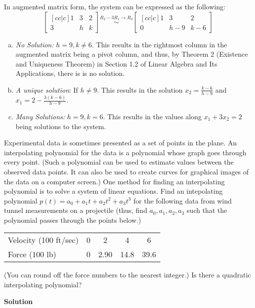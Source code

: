 \documentclass[11pt]{scrartcl}
\theoremstyle{dotlessP}
\theoremstyle{dotlessN}
\begin{document}
In augmented matrix form, the system can be expressed as the following:
\[
	\begin{bmatrix}[cc|c]
	1 & 3 & 2 \\
	3 & h & k
\end{bmatrix} \stackrel{R_2 - 3R_1 \to R_2}{\sim} 
\begin{bmatrix}[cc|c]
	1 & 3 & 2 \\
	0 & h-9 & k-6
\end{bmatrix}
\] 
\begin{enumerate}[a)]
	\item \textit{No Solution:} $h = 9, k \neq 6$. This results in the rightmost column in the augmented matrix being a pivot column, and thus, by Theorem 2 (Existence and Uniqueness Theorem) in Section 1.2 of Linear Algebra and Its Applications, there is is no solution.
	\item \textit{A unique solution}: If $h \neq 9$. This results in the solution $x_2 = \frac{k-6}{h-9}$ and $x_1 = 2 - \frac{3(k-6)}{h-9}$.
	\item \textit{Many Solutions:} $h = 9, k=6$. This results in the values along $x_1 + 3x_2 = 2$ being solutions to the system.
\end{enumerate}
\begin{ques}
	Experimental data is sometimes presented as a set of points in the plane. An interpolating polynomial for the data is a polynomial whose graph goes through every point. (Such a polynomial can be used to estimate values between the observed data points. It can also be used to create curves for graphical images of the data on a computer screen.) One method for finding an interpolating polynomial is to solve a system of linear equations. Find an intepolating polynomial $p(t) = a_0 + a_1t + a_2t^2 + a_3t^3$ for the following data from wind tunnel measurements on a projectile (thus, find $a_0,a_1,a_2,a_3$ such that the polynomial passes through the points below.)
	\begin{center}
		\begin{tabular}{l|cccc}
			\hline
			Velocity (100 ft/sec) & 0 & 2 & 4 & 6 \\
			Force (100 lb) & 0 & 2.90 & 14.8 & 39.6 \\
			\hline
		\end{tabular}
	\end{center}
(You can round off the force numbers to the nearest integer.) Is there a quadratic interpolating polynomial?
\end{ques}
\textbf{Solution}
\end{document}
